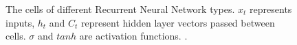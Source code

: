 \begin{figure}[ht!]
    \centering
    \qquad
    \qquad
    \qquad
    \caption{The cells of different Recurrent Neural Network types. $x_t$ represents inputs, $h_t$ and $C_t$ represent hidden layer vectors passed between cells. $\sigma$ and $tanh$ are activation functions. \cite{lopez_rnn_nodate}.
    \label{fig:RNNs}}
\end{figure}

